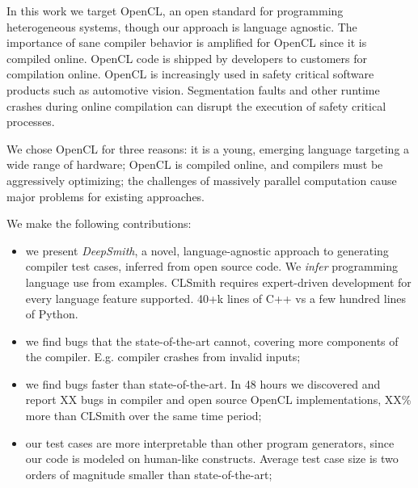 In this work we target OpenCL, an open standard for programming heterogeneous systems, though our approach is language agnostic. The importance of sane compiler behavior is amplified for OpenCL since it is compiled online. OpenCL code is shipped by developers to customers for compilation online. OpenCL is increasingly used in safety critical software products such as automotive vision. Segmentation faults and other runtime crashes during online compilation can disrupt the execution of safety critical processes.

We chose OpenCL for three reasons:
it is a young, emerging language targeting a wide range of hardware;
OpenCL is compiled online, and compilers must be aggressively optimizing;
the challenges of massively parallel computation cause major problems for existing approaches.

We make the following contributions:
%
\begin{itemize}
\item we present \emph{DeepSmith}, a novel, language-agnostic approach to generating compiler test cases, inferred from open source code. We \emph{infer} programming language use from examples. CLSmith requires expert-driven development for every language feature supported. 40+k lines of C++ vs a few hundred lines of Python.
\item we find bugs that the state-of-the-art cannot, covering more components of the compiler. E.g. compiler crashes from invalid inputs;
\item we find bugs faster than state-of-the-art. In 48 hours we discovered and report XX bugs in compiler and open source OpenCL implementations, XX\% more than CLSmith over the same time period;
\item our test cases are more interpretable than other program generators, since our code is modeled on human-like constructs. Average test case size is two orders of magnitude smaller than state-of-the-art;
\end{itemize}
